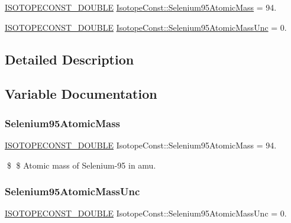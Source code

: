 \begin{DoxyCompactItemize}
\item 
\mbox{\hyperlink{group___isotope_const-_macros_ga8f45a7272ce02c0b4c65c44636ed719a}{I\+S\+O\+T\+O\+P\+E\+C\+O\+N\+S\+T\+\_\+\+D\+O\+U\+B\+LE}} \mbox{\hyperlink{group___isotope_const-_selenium-_se95_ga94e26910e4deb026a4fa8fe40f4899a7}{Isotope\+Const\+::\+Selenium95\+Atomic\+Mass}} = 94.
\item 
\mbox{\hyperlink{group___isotope_const-_macros_ga8f45a7272ce02c0b4c65c44636ed719a}{I\+S\+O\+T\+O\+P\+E\+C\+O\+N\+S\+T\+\_\+\+D\+O\+U\+B\+LE}} \mbox{\hyperlink{group___isotope_const-_selenium-_se95_gad1d9c3f71d676c79ace2f6b022aa9fdc}{Isotope\+Const\+::\+Selenium95\+Atomic\+Mass\+Unc}} = 0.
\end{DoxyCompactItemize}


\subsection{Detailed Description}


\subsection{Variable Documentation}
\mbox{\label{group___isotope_const-_selenium-_se95_ga94e26910e4deb026a4fa8fe40f4899a7}} 
\subsubsection{\texorpdfstring{Selenium95\+Atomic\+Mass}{Selenium95AtomicMass}}
{\footnotesize\ttfamily \mbox{\hyperlink{group___isotope_const-_macros_ga8f45a7272ce02c0b4c65c44636ed719a}{I\+S\+O\+T\+O\+P\+E\+C\+O\+N\+S\+T\+\_\+\+D\+O\+U\+B\+LE}} Isotope\+Const\+::\+Selenium95\+Atomic\+Mass = 94.}

\$ \$ Atomic mass of Selenium-\/95 in amu. \mbox{\label{group___isotope_const-_selenium-_se95_gad1d9c3f71d676c79ace2f6b022aa9fdc}} 
\subsubsection{\texorpdfstring{Selenium95\+Atomic\+Mass\+Unc}{Selenium95AtomicMassUnc}}
{\footnotesize\ttfamily \mbox{\hyperlink{group___isotope_const-_macros_ga8f45a7272ce02c0b4c65c44636ed719a}{I\+S\+O\+T\+O\+P\+E\+C\+O\+N\+S\+T\+\_\+\+D\+O\+U\+B\+LE}} Isotope\+Const\+::\+Selenium95\+Atomic\+Mass\+Unc = 0.}

